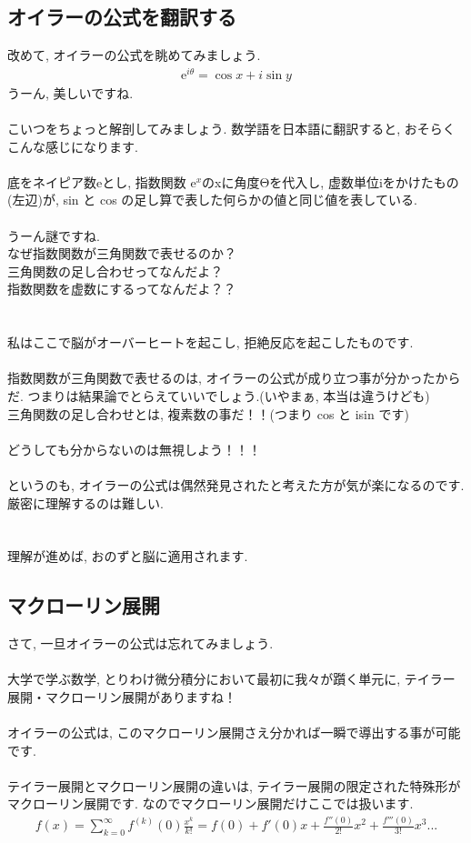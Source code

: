 \documentclass[11pt,a4paper]{jreport}
\begin{document}
\subsection{オイラーの公式を翻訳する}
改めて, オイラーの公式を眺めてみましょう.\\
\begin{eqnarray}
\mathrm{e}^{i\theta} = \cos x + i\sin y
\end{eqnarray}
うーん, 美しいですね.\\
\\
こいつをちょっと解剖してみましょう. 数学語を日本語に翻訳すると, おそらくこんな感じになります.
\\
\\
底をネイピア数eとし, 指数関数 $\mathrm{e}^x$のxに角度Θを代入し, 虚数単位iをかけたもの(左辺)が, sin と cos の足し算で表した何らかの値と同じ値を表している.\\
\\
うーん謎ですね.\\
なぜ指数関数が三角関数で表せるのか？\\
三角関数の足し合わせってなんだよ？\\
指数関数を虚数にするってなんだよ？？\\
\\
\\
私はここで脳がオーバーヒートを起こし, 拒絶反応を起こしたものです.\\
\\
指数関数が三角関数で表せるのは, オイラーの公式が成り立つ事が分かったからだ. つまりは結果論でとらえていいでしょう.(いやまぁ, 本当は違うけども) \\
三角関数の足し合わせとは, 複素数の事だ！！(つまり cos と isin です)\\
\\
どうしても分からないのは無視しよう！！！\\
\\
というのも, オイラーの公式は偶然発見されたと考えた方が気が楽になるのです. 厳密に理解するのは難しい.\\
\\
\\
理解が進めば, おのずと脳に適用されます.
\subsection{マクローリン展開}
さて, 一旦オイラーの公式は忘れてみましょう.\\
\\
大学で学ぶ数学, とりわけ微分積分において最初に我々が躓く単元に, テイラー展開・マクローリン展開がありますね！\\
\\
オイラーの公式は, このマクローリン展開さえ分かれば一瞬で導出する事が可能です.\\
\\
テイラー展開とマクローリン展開の違いは, テイラー展開の限定された特殊形がマクローリン展開です. なのでマクローリン展開だけここでは扱います.\\
\begin{eqnarray}
f(x) = \sum_{k=0}^\infty f^{(k)} (0) \frac{x^k}{k!} = f(0) + f'(0)x + \frac{f''(0)}{2!}x^2 + \frac{f'''(0)}{3!}x^3 ...
\end{eqnarray}
\end{document}
